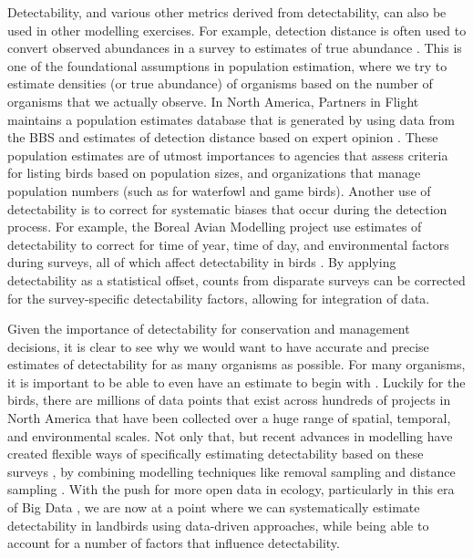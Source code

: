 \par Detectability, and various other metrics derived from detectability, can also be used in other modelling exercises.
For example, detection distance is often used to convert observed abundances in a survey to estimates of true abundance \citep{buckland_introduction_2001, buckland_distance_2015}.
This is one of the foundational assumptions in population estimation, where we try to estimate densities (or true abundance) of organisms based on the number of organisms that we actually observe.
In North America, Partners in Flight maintains a population estimates database that is generated by using data from the BBS and estimates of detection distance based on expert opinion \citep{will_handbook_2020, stanton_estimating_2019}.
These population estimates are of utmost importances to agencies that assess criteria for listing birds based on population sizes, and organizations that manage population numbers (such as for waterfowl and game birds).
Another use of detectability is to correct for systematic biases that occur during the detection process.
For example, the Boreal Avian Modelling project use estimates of detectability to correct for time of year, time of day, and environmental factors during surveys, all of which affect detectability in birds \cite{solymos_lessons_2020, solymos_evaluating_2018, marsh_correcting_1989}.
By applying detectability as a statistical offset, counts from disparate surveys can be corrected for the survey-specific detectability factors, allowing for integration of data.

\par Given the importance of detectability for conservation and management decisions, it is clear to see why we would want to have accurate and precise estimates of detectability for as many organisms as possible.
For many organisms, it is important to be able to even have an estimate to begin with \citep{bennett_how_2024}.
Luckily for the birds, there are millions of data points that exist across hundreds of projects in North America that have been collected over a huge range of spatial, temporal, and environmental scales.
Not only that, but recent advances in modelling have created flexible ways of specifically estimating detectability based on these surveys \citep{solymos_calibrating_2013}, by combining modelling techniques like removal sampling \citep{alldredge_time--detection_2007, farnsworth_removal_2002} and distance sampling \citep{buckland_introduction_2001}.
With the push for more open data in ecology, particularly in this era of Big Data \citep{binley_minimizing_2023}, we are now at a point where we can systematically estimate detectability in landbirds using data-driven approaches, while being able to account for a number of factors that influence detectability.


